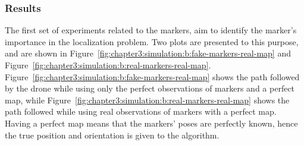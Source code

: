 \subsubsection{Results}
\label{subsubsec:chapter3:simulation:b:results}
The first set of experiments related to the markers, aim to identify the marker's importance in the localization problem. Two plots are presented to this purpose, and are shown in Figure~\ref{fig:chapter3:simulation:b:fake-markers-real-map} and Figure~\ref{fig:chapter3:simulation:b:real-markers-real-map}. Figure~\ref{fig:chapter3:simulation:b:fake-markers-real-map} shows the path followed by the drone while using only the perfect observations of markers and a perfect map, while Figure~\ref{fig:chapter3:simulation:b:real-markers-real-map} shows the path followed while using real observations of markers with a perfect map. Having a perfect map means that the markers' poses are perfectly known, hence the true position and orientation is given to the algorithm. \\
